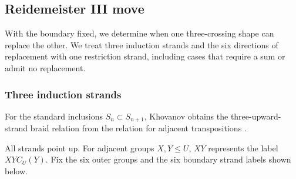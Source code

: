 \documentclass[11pt,a4paper]{article}
\numberwithin{equation}{section}
\theoremstyle{definition}
\begin{document}
\subsection{Reidemeister III move}\label{sec:reidemeister-three}

With the boundary fixed, we determine when one three-crossing shape
can replace the other. We treat three induction strands and the six
directions of replacement with one restriction strand, including
cases that require a sum or admit no replacement.

\subsubsection{Three induction strands}

For the standard inclusions \(S_n\subset S_{n+1}\), Khovanov obtains
the three-upward-strand braid relation from the relation for adjacent
transpositions \cite[Prop.~7]{khovanov}.

All strands point up. For adjacent groups \(X,Y\le U\),
\(\boxed{XY}\) represents the label \(\boxed{XY}C_U(Y)\).
Fix the six outer groups and the six boundary strand labels shown
below.
\end{document}
